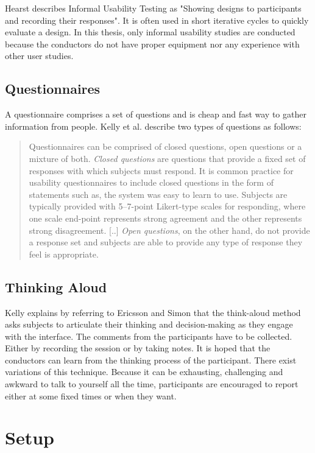 \documentclass[11pt]{report}
\begin{document}
Hearst \cite{Hearst2009} describes Informal Usability Testing as "Showing designs to participants and recording their responses". It is often used in short iterative cycles to quickly evaluate a design. In this thesis, only informal usability studies are conducted because the conductors do not have proper equipment nor any experience with other user studies.

\subsection{Questionnaires}

A questionnaire comprises a set of questions and is cheap and fast way to gather information from people. Kelly et al. \cite{Kelly2008} describe two types of questions as follows:

\begin{quote}
	Questionnaires can be comprised of closed questions, open questions or a mixture of both. \textit{Closed questions} are questions that provide a fixed set of responses with which subjects must respond. It is common practice for usability questionnaires to include closed questions in the form of statements such as, the system was easy to learn to use. Subjects are typically provided with 5–7-point Likert-type scales for responding, where one scale end-point represents strong agreement and the other represents strong disagreement. [..] \textit{Open questions}, on the other hand, do not provide a response set and subjects are able to provide any type of response they feel is appropriate. 
	\end{quote}


\subsection{Thinking Aloud}

Kelly \cite{Kelly2007} explains by referring to Ericsson and Simon \cite{Ericsson1993} that the think-aloud method asks subjects to articulate their thinking and decision-making as they engage with the interface. The comments from the participants have to be collected. Either by recording the session or by taking notes. It is hoped that the conductors can learn from the thinking process of the participant. There exist variations of this technique. Because it can be exhausting, challenging and awkward to talk to yourself all the time, participants are encouraged to report either at some fixed times or when they want.

\section{Setup}
\end{document}
